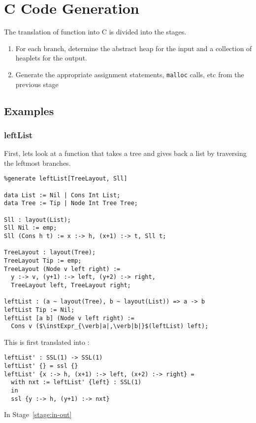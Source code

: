 \section{C Code Generation}

The translation of \PikaCore{} function into C is divided into the stages.

\begin{enumerate}
  \item \label{stage:in-out} For each branch, determine the abstract heap for the input and a collection of
    heaplets for the output.
  \item Generate the appropriate assignment statements, \verb|malloc| calls, etc from the
    previous stage
\end{enumerate}

\subsection{Examples}

\subsubsection{leftList}
First, lets look at a \Pika{} function that takes a tree and gives back a list by traversing the leftmost branches.

\begin{lstlisting}
%generate leftList[TreeLayout, Sll]

data List := Nil | Cons Int List;
data Tree := Tip | Node Int Tree Tree;

Sll : layout(List);
Sll Nil := emp;
Sll (Cons h t) := x :-> h, (x+1) :-> t, Sll t;

TreeLayout : layout(Tree);
TreeLayout Tip := emp;
TreeLayout (Node v left right) :=
  y :-> v, (y+1) :-> left, (y+2) :-> right,
  TreeLayout left, TreeLayout right;

leftList : (a ~ layout(Tree), b ~ layout(List)) => a -> b
leftList Tip := Nil;
leftList [a b] (Node v left right) :=
  Cons v ($\instExpr_{\verb|a|,\verb|b|}$(leftList) left);
\end{lstlisting}

\noindent
This is first translated into \PikaCore:

\begin{lstlisting}
leftList' : SSL(1) -> SSL(1)
leftList' {} = ssl {}
leftList' {x :-> h, (x+1) :-> left, (x+2) :-> right} =
  with nxt := leftList' {left} : SSL(1)
  in
  ssl {y :-> h, (y+1) :-> nxt}
\end{lstlisting}

\noindent
In Stage~\ref{stage:in-out}

